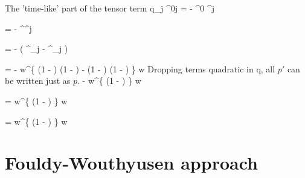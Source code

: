 The 'time-like' part of the tensor term
\beq
	\srb  {} q_j \sigma^{0j} \sr
		=	 -  \srb \gamma^0 \gamma^j \sr 		
 \eeq
 
 \beq
 	=  -  \sr^\dagger \gamma^j \sr
 \eeq
 
 \beq
 	= -   \left( \eta^\dagger \sigma_j \chi - \chi^\dagger \sigma_j \eta \right )
 \eeq
 
\beq
	= -   w^\dagger \left \{
		\left(1 -  \right )   \left(1 -  \right )
		- \left(1 -  \right )  \left(1 -  \right )
	\right \} w
\eeq
Dropping terms quadratic in q, all $p'$ can be written just as $p$.
\beq
	\approx -   w^\dagger \left \{
		 \left(1 -  \right )
	\right \} w
\eeq		

\beq
	=    w^\dagger \left \{
		 \left(1 -  \right )
	\right \} w
\eeq

\beq
	=  w^\dagger \left \{
		 \left(1 -  \right )
	\right \} w
\eeq

			


 \section{Fouldy-Wouthyusen approach}
 
 
 
 